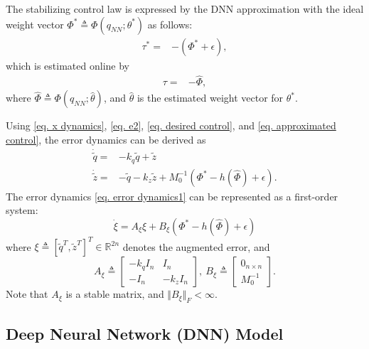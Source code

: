 \documentclass[lettersize,journal]{IEEEtran}
\begin{document}
The stabilizing control law is expressed by the DNN approximation with the ideal weight vector $\Phi^*\triangleq\Phi(q_{NN};\theta^*)$ as follows:
\begin{align}
    \tau^*=& -(\Phi^*+\epsilon),
\end{align}
which is estimated online by
\begin{align}
    \tau =& -\hat\Phi,
    \label{eq. approximated control}
\end{align}
where $\hat\Phi\triangleq\Phi(q_{NN};\hat\theta)$, and  $\hat\theta$ is the estimated weight vector for $\theta^*$.

Using \eqref{eq. x dynamics}, \eqref{eq. e2}, \eqref{eq. desired control}, and \eqref{eq. approximated control}, the error dynamics can be derived as
\begin{equation}
    \begin{aligned}
        \dot {\tilde q} = & -{k_q} {\tilde q} + {\tilde z} \\
        \dot {\tilde z} = & -{\tilde q} -{k_z} {\tilde z} + M_0^{-1} (\Phi^*-h(\hat\Phi)+\epsilon).
    \end{aligned}
    \label{eq. error dynamics1}
\end{equation}
The error dynamics \eqref{eq. error dynamics1} can be represented as a first-order system: 
\begin{equation}
    \dot\xi = A_\xi \xi + B_\xi (\Phi^*-h(\hat\Phi)+\epsilon)
    \label{eq. xi dynamics}
\end{equation}
where 
$\xi\triangleq[{\tilde q}^T  , {\tilde z}^T  ]^T  \in\mathbb{R}^{2n}$ denotes the augmented error,
and
\begin{equation*}
    A_\xi \triangleq 
    \begin{bmatrix}
        -{k_q} I_n &I_n\\-I_n& -{k_z} I_n
    \end{bmatrix}
    ,\ 
    B_\xi \triangleq 
    \begin{bmatrix}
        0_{n\times n}\\M_0^{-1}
    \end{bmatrix}.
\end{equation*}
Note that $A_\xi$ is a stable matrix, and $\Vert B_\xi\Vert_F<\infty$.

\subsection{Deep Neural Network (DNN) Model}\label{NN definition}
\end{document}
